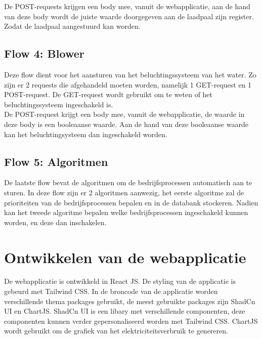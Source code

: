 De POST-requests krijgen een body mee, vanuit de webapplicatie, aan de hand van deze body wordt de juiste waarde doorgegeven aan de laadpaal zijn register. Zodat de laadpaal aangestuurd kan worden.

\subsection{Flow 4: Blower}
\label{subsec:proefopstelling-blower}

Deze flow dient voor het aansturen van het beluchtingssysteem van het water. Zo zijn er 2 requests die afgehandeld moeten worden, namelijk 1 GET-request en 1 POST-request. De GET-request wordt gebruikt om te weten of het beluchtingssysteem ingeschakeld is.\\

De POST-request krijgt een body mee, vanuit de webapplicatie, de waarde in deze body is een booleaanse waarde. Aan de hand van deze booleaanse waarde kan het beluchtingsysteem dan ingeschakeld worden.

\subsection{Flow 5: Algoritmen}
\label{subsec:proefopstelling-algoritmen}

De laatste flow bevat de algoritmen om de bedrijfsprocessen automatisch aan te sturen. In deze flow zijn er 2 algoritmen aanwezig, het eerste algoritme zal de prioriteiten van de bedrijfsprocessen bepalen en in de databank stockeren. Nadien kan het tweede algoritme bepalen welke bedrijfsprocessen ingeschakeld kunnen worden, en deze dan inschakelen. 

\section{Ontwikkelen van de webapplicatie}
\label{sec:proefopstelling-webapplicatie}

De webapplicatie is ontwikkeld in React JS. De styling van de applicatie is gebeurd met Tailwind CSS. In de broncode van de applicatie worden verschillende thema packages gebruikt, de meest gebruikte packages zijn ShadCn UI en ChartJS. ShadCn UI is een libary met verschillende componenten, deze componenten kunnen verder gepersonaliseerd worden met Tailwind CSS. ChartJS wordt gebruikt om de grafiek van het elektriciteitsverbruik te genereren.\\